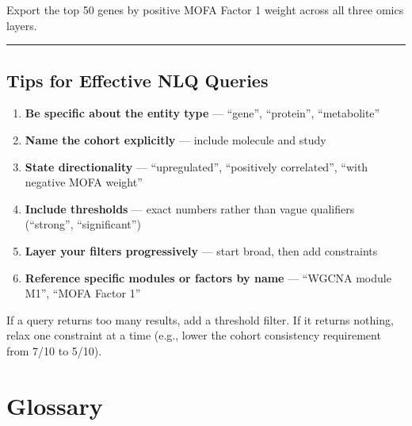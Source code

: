 \documentclass[
  letterpaper,
  oneside,
  open=any]{scrbook}
\providecommand{\tightlist}{%
  \setlength{\itemsep}{0pt}\setlength{\parskip}{0pt}}
\begin{document}
Export the top 50 genes by positive MOFA Factor 1 weight across all
three omics layers.

\begin{center}\rule{0.5\linewidth}{0.5pt}\end{center}

\section{Tips for Effective NLQ
Queries}\label{tips-for-effective-nlq-queries}

\begin{enumerate}
\def\labelenumi{\arabic{enumi}.}
\tightlist
\item
  \textbf{Be specific about the entity type} --- ``gene'', ``protein'',
  ``metabolite''
\item
  \textbf{Name the cohort explicitly} --- include molecule and study
\item
  \textbf{State directionality} --- ``upregulated'', ``positively
  correlated'', ``with negative MOFA weight''
\item
  \textbf{Include thresholds} --- exact numbers rather than vague
  qualifiers (``strong'', ``significant'')
\item
  \textbf{Layer your filters progressively} --- start broad, then add
  constraints
\item
  \textbf{Reference specific modules or factors by name} --- ``WGCNA
  module M1'', ``MOFA Factor 1''
\end{enumerate}

\begin{tcolorbox}[enhanced jigsaw, arc=.35mm, bottomrule=.15mm, bottomtitle=1mm, breakable, colback=white, colbacktitle=quarto-callout-tip-color!10!white, colframe=quarto-callout-tip-color-frame, coltitle=black, left=2mm, leftrule=.75mm, opacityback=0, opacitybacktitle=0.6, rightrule=.15mm, title=\textcolor{quarto-callout-tip-color}{\faLightbulb}\hspace{0.5em}{Tip}, titlerule=0mm, toprule=.15mm, toptitle=1mm]

If a query returns too many results, add a threshold filter. If it
returns nothing, relax one constraint at a time (e.g., lower the cohort
consistency requirement from 7/10 to 5/10).

\end{tcolorbox}


\chapter{Glossary}\label{glossary}
\end{document}
